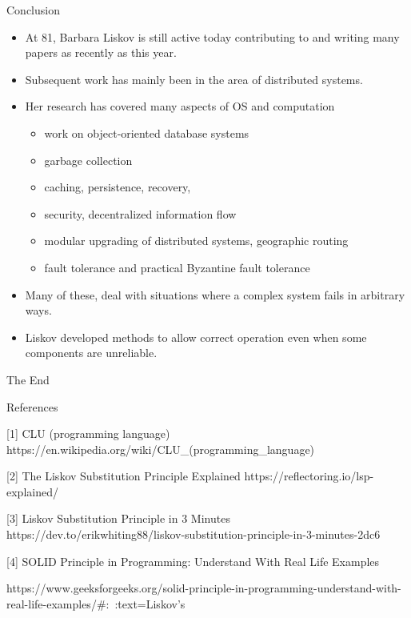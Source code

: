 \documentclass{beamer}
\begin{document}
\begin{frame}{Conclusion}
\begin{itemize}
\item At 81, Barbara Liskov is still active today contributing to and writing many papers as recently as this year.
\item Subsequent work has mainly been in the area of distributed systems. 
\item Her research has covered many aspects of OS and computation \begin{itemize}
    \item work on object-oriented database systems
    \item  garbage collection
    \item caching, persistence, recovery, 
    \item security, decentralized information flow
    \item modular upgrading of distributed systems, geographic routing
    \item fault tolerance and practical Byzantine fault tolerance
\end{itemize}  
\item Many of these, deal with situations where a complex system fails in arbitrary ways. 
\item Liskov developed methods to allow correct operation even when some components are unreliable.
 

\end{itemize}
\end{frame}




\begin{frame}
\Huge{\centerline{The End}}
\end{frame}

\begin{frame}{References}

[1] {CLU (programming language)} https://en.wikipedia.org/wiki/CLU_(programming_language)

[2] {The Liskov Substitution Principle Explained} https://reflectoring.io/lsp-explained/

\vspace{1mm}

[3] {Liskov Substitution Principle in 3 Minutes}
https://dev.to/erikwhiting88/liskov-substitution-principle-in-3-minutes-2dc6

\vspace{1mm}

[4] {SOLID Principle in Programming: Understand With Real Life Examples}

https://www.geeksforgeeks.org/solid-principle-in-programming-understand-with-real-life-examples/#:~:text=Liskov's%

\end{frame}
\end{document}
